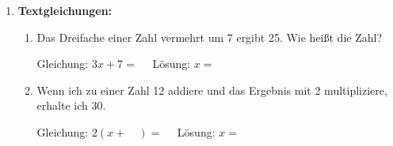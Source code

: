 \begin{enumerate}[label=\arabic*., resume]
\begin{enumerate}[label=\alph*)]
    \end{enumerate}

    \vspace{1cm}

    \item \textbf{Textgleichungen:}

    \vspace{0.5cm}

    \begin{enumerate}[label=\alph*)]
        \item Das Dreifache einer Zahl vermehrt um 7 ergibt 25. Wie heißt die Zahl?

        \vspace{0.3cm}
        Gleichung: $3x + 7 = \phantom{00}$
        \vspace{0.3cm}
        Lösung: $x = $ \underline{\hspace{2cm}}

        \vspace{0.5cm}

        \item Wenn ich zu einer Zahl 12 addiere und das Ergebnis mit 2 multipliziere, erhalte ich 30.

        \vspace{0.3cm}
        Gleichung: $2(x + \phantom{00}) = \phantom{00}$
        \vspace{0.3cm}
        Lösung: $x = $ \underline{\hspace{2cm}}

    \end{enumerate}

\end{enumerate}